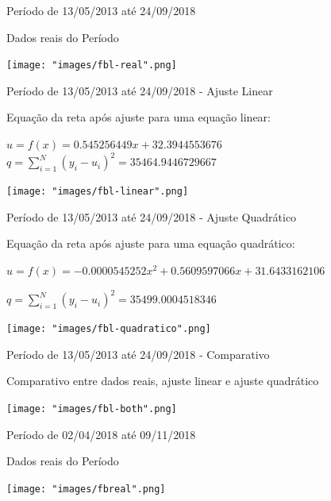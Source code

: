 \documentclass[10pt]{beamer}
\begin{document}
\begin{frame}{Período de 13/05/2013 até 24/09/2018}

  Dados reais do Período
  
  \texttt{[image: "images/fbl-real".png]}
\end{frame}

\begin{frame}{Período de 13/05/2013 até 24/09/2018 - Ajuste Linear}

  Equação da reta após ajuste para uma equação linear:
  \begin{center}
  $u = f(x) = 0.545256449x + 32.3944553676$
  $q = \sum_{i=1}^{N} (y_{i}-u_{i})^{2} = 35464.9446729667$
  \end{center}
  
  \begin{center}
    \texttt{[image: "images/fbl-linear".png]}
  \end{center}
\end{frame}

\begin{frame}{Período de 13/05/2013 até 24/09/2018 - Ajuste Quadrático}

  Equação da reta após ajuste para uma equação quadrático:
  \begin{center}
  $u = f(x) = -0.0000545252x^2 + 0.5609597066x + 31.6433162106$
  
 $q = \sum_{i=1}^{N} (y_{i}-u_{i})^{2} = 35499.0004518346$
  \end{center}
  
  \begin{center}
    \texttt{[image: "images/fbl-quadratico".png]}
  \end{center}
\end{frame}

\begin{frame}{Período de 13/05/2013 até 24/09/2018 - Comparativo}

  Comparativo entre dados reais, ajuste linear e ajuste quadrático
  
  \begin{center}
    \texttt{[image: "images/fbl-both".png]}
  \end{center}
\end{frame}

\begin{frame}{Período de 02/04/2018 até 09/11/2018}

  Dados reais do Período
  
  \begin{center}
    \texttt{[image: "images/fbreal".png]}
  \end{center}
\end{frame}
\end{document}
